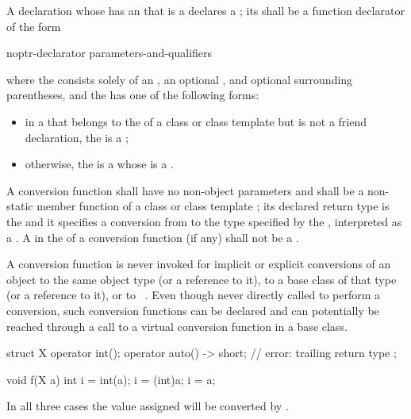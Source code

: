 \pnum
A declaration
whose  has
an  that is a 
declares a ;
its  shall be
a function declarator of the form
\begin{ncsimplebnf}
noptr-declarator parameters-and-qualifiers
\end{ncsimplebnf}
where the  consists solely of
an ,
an optional , and
optional surrounding parentheses, and
the  has one of the following forms:
\begin{itemize}
\item
in a  that belongs to
the  of a class or class template
but is not a friend declaration,
the  is a ;
\item
otherwise, the  is a 
whose  is a .
\end{itemize}

\pnum
A conversion function  shall have no non-object parameters and
shall be a non-static member function of a class or class template ;
its declared return type is the  and
it specifies a conversion from  to
the type specified by the ,
interpreted as a .
A  in the 
of a conversion function (if any) shall not be
a .

\pnum
\begin{note}
A conversion function is never invoked for
implicit or explicit conversions of an object
to the same object type (or a reference to it),
to a base class of that type (or a reference to it),
or to \cv{}~.
Even though never directly called to perform a conversion,
such conversion functions can be declared and can potentially
be reached through a call to a virtual conversion function in a base class.
\end{note}
\begin{example}
\begin{codeblock}
struct X {
  operator int();
  operator auto() -> short;     // error: trailing return type
};

void f(X a) {
  int i = int(a);
  i = (int)a;
  i = a;
}
\end{codeblock}
In all three cases the value assigned will be converted by
.
\end{example}

